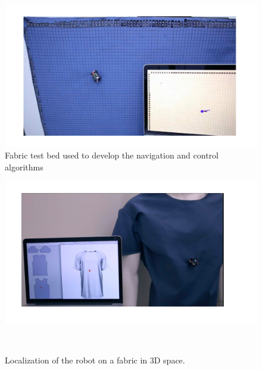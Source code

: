 \begin{figure}[h]
\centering
\includegraphics[width=0.9\columnwidth]{pictures/chapter5/rovable_fabric_navigation.pdf}
\caption{Fabric test bed used to develop the navigation and control algorithms }
\label{fig:test_bed}
\end{figure}

\begin{figure}[h]
\centering
  \includegraphics[width=0.9\columnwidth]{pictures/chapter5/3d_rovables_navigation.pdf}
  \caption{Localization of the robot on a fabric in 3D space. }~\label{fig:3d_rovables_navigation}
\end{figure}


